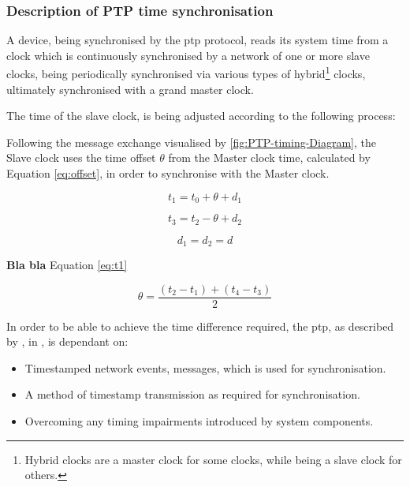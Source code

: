 \subsubsection{Description of PTP time synchronisation}

A device, being synchronised  by the \acrshort{ptp} protocol, reads its system time from a clock which is continuously synchronised by a network of one or more slave clocks, being periodically synchronised via various types of hybrid\footnote{Hybrid clocks are a master clock for some clocks, while being a slave clock for others.} clocks, ultimately synchronised with a grand master clock.

The time of the slave clock, is being adjusted according to the following process:

Following the message exchange visualised by \figureautorefname { } \ref{fig:PTP-timing-Diagram}, the Slave clock  uses the time offset $\theta$ from the Master clock time, calculated by Equation \ref{eq:offset}, in order to synchronise with the Master clock. 


\begin{equation} \label{eq:t1}
t_1 = t_0 + \theta + d_1 
\end{equation}

\begin{equation} \label{eq:t3}
t_3 = t_2 - \theta + d_2 
\end{equation}

\begin{equation}   \label{eq:d1}
d_1 = d_2 = d  
\end{equation}

\textbf{Bla bla }Equation \ref{eq:t1}

\begin{equation}  \label{eq:offset}
\theta = \frac{(t_2 - t_1) + (t_4 - t_3)}{2}
\end{equation}

In order to be able to achieve the time difference required, the \acrshort{ptp}, as described by  \citeauthor{Eidson2006}, in \cite{Eidson2006}, is dependant on:

\begin{itemize}
    \item Timestamped network events, messages, which is  used for synchronisation.
    \item A method of timestamp transmission as required for synchronisation.
    \item Overcoming any timing impairments introduced by system components.
\end{itemize}





